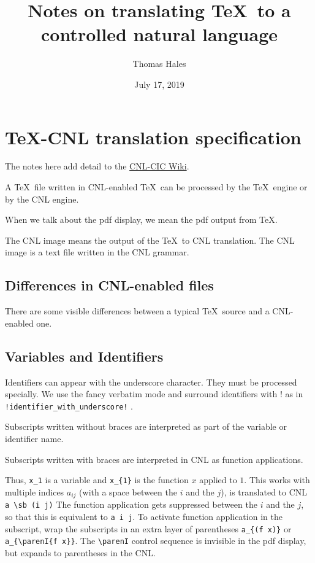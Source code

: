 \documentclass[12pt]{amsart}
\title{Notes on translating \TeX\ to a controlled natural language}
\date{July 17, 2019}                                           %
\author{Thomas Hales}
\begin{document}
\maketitle



\section{\TeX-CNL translation specification}

The notes here add detail to the
 \href{https://github.com/formalabstracts/CNL-CIC/wiki/Conversion-from-LaTeX}{CNL-CIC Wiki}.

A \TeX\ file written in CNL-enabled \TeX\ can be processed 
by the \TeX\ engine or by the CNL engine.


When
we talk about the pdf display, we mean the pdf output 
from \TeX.

The CNL image
means the output of the \TeX\ to CNL translation.  The CNL image is a
text file written in the CNL grammar.


\subsection{Differences in CNL-enabled files}

There are some visible differences between a typical \TeX\ source
and a CNL-enabled one.

\subsection{Variables and Identifiers}

Identifiers can appear with the underscore character.  They must be
processed specially.   We use the fancy verbatim mode and surround
identifiers with ! as in \verb'!identifier_with_underscore!' .

Subscripts written without braces are interpreted as part of the variable
or identifier name.

Subscripts written with braces are interpreted in CNL as function applications.

Thus, \verb!x_1! is a variable and  \verb!x_{1}!  is the function $x$ applied to $1$.
This works with multiple indices $a_{i j}$ (with a space between the $i$ and the $j$),
is translated to CNL \verb!a \sb (i j)!  The function application gets suppressed between
the $i$ and the $j$, so that this is equivalent to \verb!a i j!.   To activate function application
in the subscript, wrap the subscripts in an extra layer of parentheses \verb!a_{(f x)}! or
\verb!a_{\parenI{f x}}!.  The \verb!\parenI! control sequence is invisible in the pdf display,
but expands to parentheses in the CNL.
\end{document}
